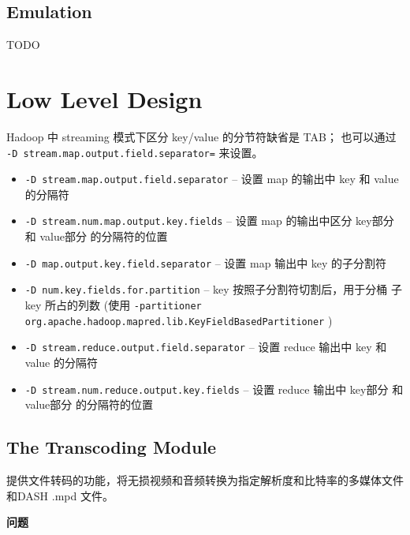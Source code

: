 \subsection{Emulation}

TODO






\section{Low Level Design}

Hadoop 中 streaming 模式下区分 key/value 的分节符缺省是 TAB；
也可以通过 \texttt{-D stream.map.output.field.separator=} 来设置。

\begin{itemize}
  \item \texttt{-D stream.map.output.field.separator} -- 设置 map 的输出中 key 和 value 的分隔符
  \item \texttt{-D stream.num.map.output.key.fields} -- 设置 map 的输出中区分 key部分 和 value部分 的分隔符的位置
  \item \texttt{-D map.output.key.field.separator} -- 设置 map 输出中 key 的子分割符
  \item \texttt{-D num.key.fields.for.partition} -- key 按照子分割符切割后，用于分桶 子key 所占的列数
        (使用 \texttt{-partitioner org.apache.hadoop.mapred.lib.KeyFieldBasedPartitioner} )
  \item \texttt{-D stream.reduce.output.field.separator} -- 设置 reduce 输出中 key 和 value 的分隔符
  \item \texttt{-D stream.num.reduce.output.key.fields} -- 设置 reduce 输出中 key部分 和 value部分 的分隔符的位置
\end{itemize}


\subsection{The Transcoding Module}

提供文件转码的功能，将无损视频和音频转换为指定解析度和比特率的多媒体文件和DASH .mpd 文件。

\textbf{问题}

